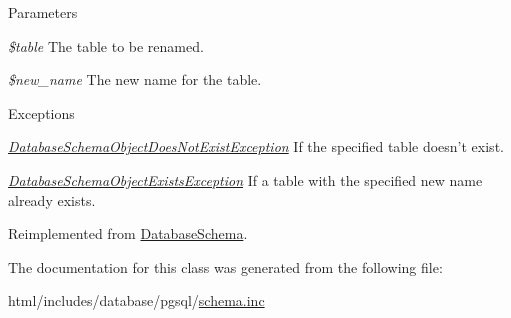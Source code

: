 \begin{DoxyParams}{Parameters}
\item[{\em \$table}]The table to be renamed. \item[{\em \$new\_\-name}]The new name for the table.\end{DoxyParams}

\begin{DoxyExceptions}{Exceptions}
\item[{\em \hyperlink{classDatabaseSchemaObjectDoesNotExistException}{DatabaseSchemaObjectDoesNotExistException}}]If the specified table doesn't exist. \item[{\em \hyperlink{classDatabaseSchemaObjectExistsException}{DatabaseSchemaObjectExistsException}}]If a table with the specified new name already exists. \end{DoxyExceptions}


Reimplemented from \hyperlink{classDatabaseSchema_aaa0b6f32797505bdfc9ed953e10a486e}{DatabaseSchema}.

The documentation for this class was generated from the following file:\begin{DoxyCompactItemize}
\item 
html/includes/database/pgsql/\hyperlink{pgsql_2schema_8inc}{schema.inc}\end{DoxyCompactItemize}

